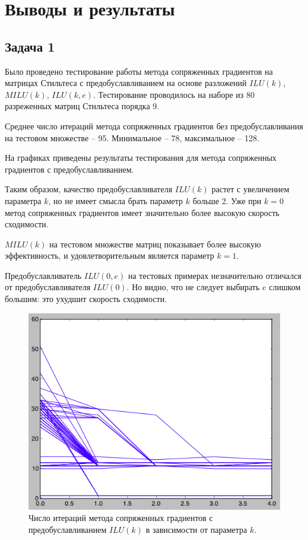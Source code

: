 \section{Выводы и результаты}
\subsection{Задача 1}
Было проведено тестирование работы метода сопряженных градиентов на матрицах Стильтеса с предобуславливанием на основе разложений $ILU(k)$, $MILU(k)$, $ILU(k, e)$. Тестирование проводилось на наборе из 80 разреженных матриц Стильтеса порядка 9.

Среднее число итераций метода сопряженных градиентов без предобуславливания на тестовом множестве – 95. Минимальное – 78, максимальное – 128.

На графиках приведены результаты тестирования для метода сопряженных градиентов с предобуславливанием.

Таким образом, качество предобуславливателя $ILU(k)$ растет с увеличением параметра $k$, но не имеет смысла брать параметр $k$ больше 2. Уже при $k=0$ метод сопряженных градиентов имеет значительно более высокую скорость сходимости.

$MILU(k)$ на тестовом множестве матриц показывает более высокую эффективность, и удовлетворительным является параметр $k=1$.

Предобуславливатель $ILU(0, e)$ на тестовых примерах незначительно отличался от предобуславливателя $ILU(0)$. Но видно, что не следует выбирать $e$ слишком большим: это ухудшит скорость сходимости.

\begin{figure}[ht]
\includegraphics[width=\textwidth,height=\textheight,keepaspectratio]{ilu_k}
\caption{Число итераций метода сопряженных градиентов с предобуславливанием $ILU(k)$ в зависимости от параметра $k$.}
\end{figure}

